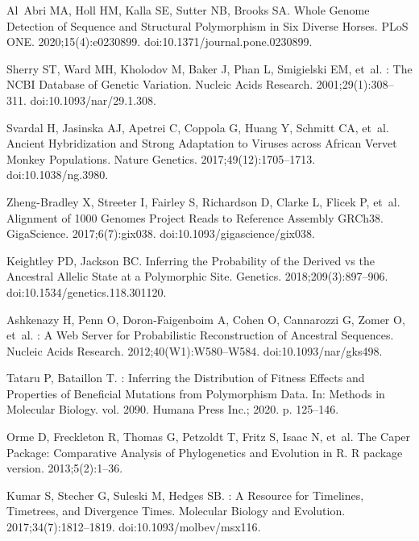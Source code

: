 \documentclass[10pt,letterpaper]{article}
\providecommand{\DIFdelbegin}{} %
\newcommand{\DIFscaledelfig}{0.5}
\newlength{\DIFdelgraphicswidth} %
\newlength{\DIFdelgraphicsheight} %
\newcommand{\DIFdelincludegraphics}[2][]{%
\sbox{\DIFdelgraphicsbox}{\DIFOincludegraphics[#1]{#2}}%
\settoboxwidth{\DIFdelgraphicswidth}{\DIFdelgraphicsbox} %
\settoboxtotalheight{\DIFdelgraphicsheight}{\DIFdelgraphicsbox} %
\scalebox{\DIFscaledelfig}{%
\parbox[b]{\DIFdelgraphicswidth}{\usebox{\DIFdelgraphicsbox}\\[-\baselineskip] \rule{\DIFdelgraphicswidth}{0em}}\llap{\resizebox{\DIFdelgraphicswidth}{\DIFdelgraphicsheight}{%
\setlength{\unitlength}{\DIFdelgraphicswidth}%
\begin{picture}(1,1)%
\thicklines\linethickness{2pt} %
{\color[rgb]{1,0,0}\put(0,0){\framebox(1,1){}}}%
{\color[rgb]{1,0,0}\put(0,0){\line( 1,1){1}}}%
{\color[rgb]{1,0,0}\put(0,1){\line(1,-1){1}}}%
\end{picture}%
}\hspace*{3pt}}} %
} %
\DeclareRobustCommand{\DIFdelbegin}{\DIFOdelbegin \let\includegraphics\DIFdelincludegraphics} %
\begin{document}
\begin{thebibliography}{10}
Al~Abri MA, Holl HM, Kalla SE, Sutter NB, Brooks SA.
\newblock Whole Genome Detection of Sequence and Structural Polymorphism in Six
Diverse Horses.
\newblock PLoS ONE. 2020;15(4):e0230899.
\newblock doi:{10.1371/journal.pone.0230899}.

Sherry ST, Ward MH, Kholodov M, Baker J, Phan L, Smigielski EM, et~al.
: The {{NCBI}} Database of Genetic Variation.
\newblock Nucleic Acids Research. 2001;29(1):308--311.
\newblock doi:{10.1093/nar/29.1.308}.

Svardal H, Jasinska AJ, Apetrei C, Coppola G, Huang Y, Schmitt CA, et~al.
\newblock Ancient Hybridization and Strong Adaptation to Viruses across
{{African}} Vervet Monkey Populations.
\newblock Nature Genetics. 2017;49(12):1705--1713.
\newblock doi:{10.1038/ng.3980}.

{Zheng-Bradley} X, Streeter I, Fairley S, Richardson D, Clarke L, Flicek P,
et~al.
\newblock Alignment of 1000 {{Genomes Project}} Reads to Reference Assembly
{{GRCh38}}.
\newblock GigaScience. 2017;6(7):gix038.
\newblock doi:{10.1093/gigascience/gix038}.

Keightley PD, Jackson BC.
\newblock Inferring the Probability of the Derived vs the Ancestral Allelic
State at a Polymorphic Site.
\newblock Genetics. 2018;209(3):897--906.
\newblock doi:{10.1534/genetics.118.301120}.

Ashkenazy H, Penn O, {Doron-Faigenboim} A, Cohen O, Cannarozzi G, Zomer O,
et~al.
: A Web Server for Probabilistic Reconstruction of
Ancestral Sequences.
\newblock Nucleic Acids Research. 2012;40(W1):W580--W584.
\newblock doi:{10.1093/nar/gks498}.

Tataru P, Bataillon T.
: {{Inferring}} the Distribution of Fitness Effects and
Properties of Beneficial Mutations from Polymorphism Data.
\newblock In: Methods in {{Molecular Biology}}. vol. 2090. Humana Press Inc.;
2020. p. 125--146.

Orme D, Freckleton R, Thomas G, Petzoldt T, Fritz S, Isaac N, et~al.
\newblock The Caper Package: Comparative Analysis of Phylogenetics and
Evolution in {{R}}.
\newblock R package version. 2013;5(2):1--36.

Kumar S, Stecher G, Suleski M, Hedges SB.
: A Resource for Timelines, Timetrees, and Divergence
Times.
\newblock Molecular Biology and Evolution. 2017;34(7):1812--1819.
\newblock doi:{10.1093/molbev/msx116}.

\end{thebibliography}
\DIFdelbegin %
\end{document}

